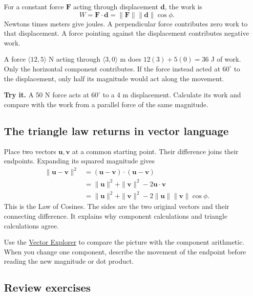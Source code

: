 For a constant force \(\mathbf F\) acting through displacement \(\mathbf d\), the work is \[
W=\mathbf F\cdot\mathbf d
=\|\mathbf F\|\|\mathbf d\|\cos\phi.
\] Newtons times meters give joules. A perpendicular force contributes zero work to that displacement. A force pointing against the displacement contributes negative work.

A force \(\langle12,5\rangle\) N acting through \(\langle3,0\rangle\) m does \(12(3)+5(0)=36\) J of work. Only the horizontal component contributes. If the force instead acted at \(60^\circ\) to the displacement, only half its magnitude would act along the movement.

\textbf{Try it.} A 50 N force acts at \(60^\circ\) to a 4 m displacement. Calculate its work and compare with the work from a parallel force of the same magnitude.

\hypertarget{m6-the-triangle-law-returns-in-vector-language}{%
\subsection{The triangle law returns in vector language}\label{m6-the-triangle-law-returns-in-vector-language}}

Place two vectors \(\mathbf u,\mathbf v\) at a common starting point. Their difference joins their endpoints. Expanding its squared magnitude gives \[
\begin{aligned}
\|\mathbf u-\mathbf v\|^2
&=(\mathbf u-\mathbf v)\cdot(\mathbf u-\mathbf v)\\
&=\|\mathbf u\|^2+\|\mathbf v\|^2-2\mathbf u\cdot\mathbf v\\
&=\|\mathbf u\|^2+\|\mathbf v\|^2
-2\|\mathbf u\|\|\mathbf v\|\cos\phi.
\end{aligned}
\] This is the Law of Cosines. The sides are the two original vectors and their connecting difference. It explains why component calculations and triangle calculations agree.

Use the \href{https://bobovski66.github.io/PrecalculusII/demos/vector_explorer.html}{Vector Explorer} to compare the picture with the component arithmetic. When you change one component, describe the movement of the endpoint before reading the new magnitude or dot product.

\hypertarget{m6-review-exercises}{%
\subsection{Review exercises}\label{m6-review-exercises}}

